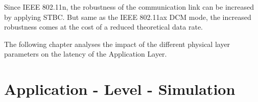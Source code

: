 \documentclass[]{nsm-thesis}
\begin{document}
Since IEEE 802.11n, the robustness of the communication link can be increased by applying \ac{STBC}.
But same as the IEEE 802.11ax \ac{DCM} mode, the
increased robustness comes at the cost of a reduced theoretical data rate.

The following chapter analyses the impact of the different physical layer parameters on the latency of the Application Layer.

\chapter{Application - Level - Simulation}


\begin{comment}
	\chapter{Evaluation}


\begin{itemize}
\item measurement setup / results / evaluation / discussion
\item whatever you have done, you must comment it, compare it to other systems, evaluate it
\item usually, adequate graphs help to show the benefits of your approach
\item each result/graph must not only be described, but also discussed (What's the reason for this peak? Why have you observed this effect? What does this tell about your architecture/system/implementation?)
\item recommended length: approximately one third of the thesis.
\end{itemize}
\end{comment}





\cleardoublepage

\listofabbreviations
\clearpage

\listoffigures
\clearpage

\listoftables
\clearpage

\printbibliography
\end{document}
